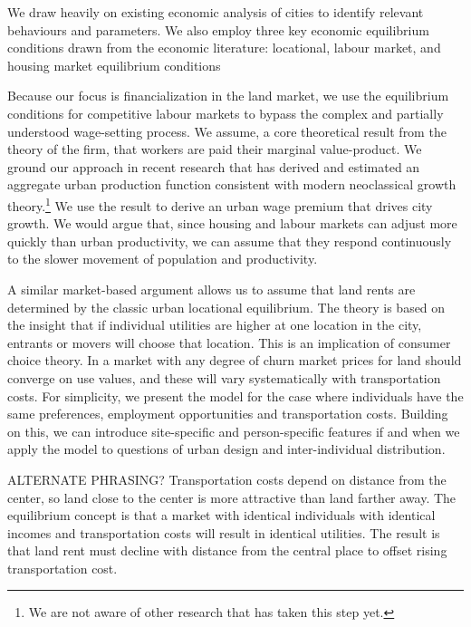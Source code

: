 {%

We draw heavily on existing economic analysis of cities to identify relevant behaviours and parameters. We also employ three key economic equilibrium conditions drawn from the economic literature: locational, labour market, and  housing market equilibrium conditions

Because our focus is financialization in the land market, we use the equilibrium conditions for competitive labour markets to bypass the complex and partially understood wage-setting process. We assume, a core theoretical result from the theory of the firm, that workers are paid their \gls{marginal value-product}. We ground our approach in recent research that has derived and estimated an aggregate urban production function consistent with modern \gls{neoclassical growth theory}.\footnote{We are not aware of other research that has taken this step yet.} We use the result to derive an urban wage premium that drives city growth. We would argue that, since housing and labour markets can adjust more quickly than urban productivity, we can assume that they respond  continuously to the slower movement of population and productivity. %

A similar market-based argument allows us to assume that land rents are determined by the classic urban locational equilibrium. The theory is based on the insight that if individual utilities are higher at one location in the city, entrants or movers will choose that  location. This is an implication of consumer choice theory. In a market with any degree of churn market prices for land should converge on use values, and these will vary systematically with transportation costs. For simplicity, we present the model for the case where individuals have the same preferences, employment opportunities and transportation costs. Building on this, 
we can introduce site-specific and person-specific features if and when we apply the model to questions of urban design and inter-individual distribution. 

{\color{red}ALTERNATE PHRASING? Transportation costs depend on distance from the center, so land close to the center is more attractive than land farther away.  The equilibrium concept is that a market with identical individuals with identical incomes and transportation costs will result in identical utilities. The result is that land rent must decline with distance from the central place to offset rising transportation cost. }

}
